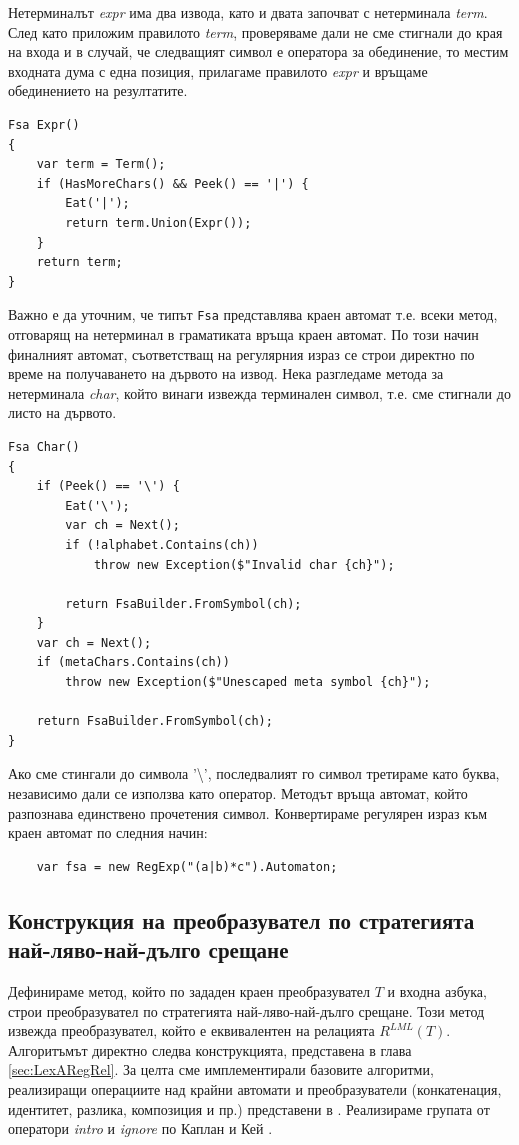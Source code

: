 \documentclass[12pt, oneside]{article}
\theoremstyle{definition}
\begin{document}
Нетерминалът \emph{expr} има два извода, като и двата започват с нетерминала \emph{term}. След като приложим правилото \emph{term}, проверяваме дали не сме стигнали до края на входа и в случай, че следващият символ е оператора за обединение, то местим входната дума с една позиция, прилагаме правилото \emph{expr} и връщаме обединението на резултатите.

\begin{verbatim}
Fsa Expr() 
{
    var term = Term();
    if (HasMoreChars() && Peek() == '|') {
        Eat('|');
        return term.Union(Expr());
    }
    return term;
}
\end{verbatim}

Важно е да уточним, че типът \verb/Fsa/ представлява краен автомат т.е. всеки метод, отговарящ на нетерминал в граматиката връща краен автомат. По този начин финалният автомат, съответстващ на регулярния израз се строи директно по време на получаването на дървото на извод. Нека разгледаме метода за нетерминала \emph{char}, който винаги извежда терминален символ, т.е. сме стигнали до листо на дървото.

\begin{verbatim}
Fsa Char() 
{
	if (Peek() == '\') {
		Eat('\');
		var ch = Next();
        if (!alphabet.Contains(ch))
			throw new Exception($"Invalid char {ch}");

      	return FsaBuilder.FromSymbol(ch);
	}
    var ch = Next();
    if (metaChars.Contains(ch))
		throw new Exception($"Unescaped meta symbol {ch}");

    return FsaBuilder.FromSymbol(ch);
}
\end{verbatim}

Ако сме стингали до символа '\textbackslash', последвалият го символ третираме като буква, независимо дали се използва като оператор. Методът връща автомат, който разпознава единствено прочетения символ. Конвертираме регулярен израз към краен автомат по следния начин:

\begin{verbatim}
	var fsa = new RegExp("(a|b)*c").Automaton;
\end{verbatim}

\subsection{Конструкция на преобразувател по стратегията най-ляво-най-дълго срещане}

Дефинираме метод, който по зададен краен преобразувател \(T\) и входна азбука, строи преобразувател по стратегията най-ляво-най-дълго срещане. Този метод извежда преобразувател, който е еквивалентен на релацията \( R^{LML}(T) \). Алгоритъмът директно следва конструкцията, представена в глава \ref{sec:LexARegRel}. За целта сме имплементирали базовите алгоритми, реализиращи операциите над крайни автомати и преобразуватели (конкатенация, идентитет, разлика, композиция и пр.) представени в \cite{Mihov:2018}. Реализираме групата от оператори \emph{intro} и \emph{ignore} по Каплан и Кей \cite{Kaplan&Kay:94}.
\end{document}
